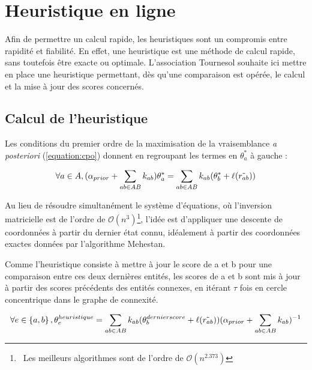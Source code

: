 \section{Heuristique en ligne}
Afin de permettre un calcul rapide, les heuristiques sont un compromis entre rapidité et fiabilité. En effet, une heuristique est une méthode de calcul rapide, sans toutefois être exacte ou optimale. L'association Tournesol souhaite ici mettre en place une heuristique permettant, dès qu'une comparaison est opérée, le calcul et la mise à jour des scores concernés.

\subsection{Calcul de l'heuristique}

Les conditions du premier ordre de la maximisation de la vraisemblance \textit{a posteriori} (\ref{equation:cpo}) donnent en regroupant les termes en $\theta^{*}_a$ à gauche :

\begin{equation}
 \forall a \in A,   (\alpha_{prior} + \sum_{ab \in AB} k_{ab}) \theta^{*}_a = \sum_{ab \in AB} k_{ab}(\theta^{*}_b + \ell(\Tilde{r_{ab}}))
\end{equation}

Au lieu de résoudre simultanément le système d'équations, où l'inversion matricielle est de l'ordre de $\mathcal{O}(n^3)$\footnote{~Les meilleurs algorithmes sont de l'ordre de $\mathcal{O}(n^{2.373})$}, l'idée est d'appliquer une descente de coordonnées à partir du dernier état connu, idéalement à partir des coordonnées exactes données par l'algorithme Mehestan. 

Comme l'heuristique consiste à mettre à jour le score de a et b pour une comparaison entre ces deux dernières entités, les scores de a et b sont mis à jour à partir des scores précédents des entités connexes, en itérant $\tau$ fois en cercle concentrique dans le graphe de connexité.

\begin{equation}
  \forall e \in \left\lbrace a,b \right\rbrace, \theta^{heuristique}_e = \sum_{ab \in AB} k_{ab}(\theta^{dernier score}_b + \ell(\Tilde{r_{ab}})) (\alpha_{prior} + \sum_{ab \in AB} k_{ab})^{-1}
\end{equation}

\pagebreak

